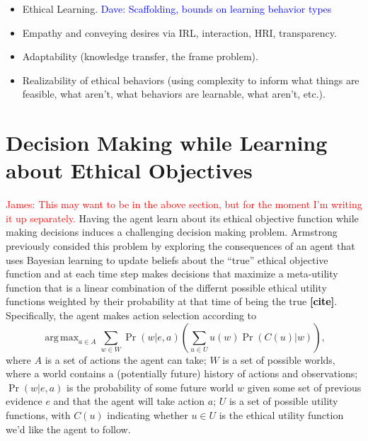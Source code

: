 \documentclass[11pt]{article}
\newcommand\davenote[1]{\textcolor{blue}{Dave: #1}}
\newcommand\jmnote[1]{\textcolor{red}{James: #1}}
\newcommand\ncite{\textcolor{black}{{\bf [cite]}}}
\DeclareMathOperator*{\argmax}{arg\,max}
\begin{document}
\begin{itemize}
\item Ethical Learning. \davenote{Scaffolding, bounds on learning behavior types}
\item Empathy and conveying desires via IRL, interaction, HRI, transparency.
\item Adaptability (knowledge transfer, the frame problem).
\item Realizability of ethical behaviors (using complexity to inform what things are feasible, what aren't, what behaviors are learnable, what aren't, etc.).
\end{itemize}

\section{Decision Making while Learning about Ethical Objectives}
\jmnote{This may want to be in the above section, but for the moment I'm writing it up separately.}
Having the agent learn about its ethical objective function while making decisions induces a challenging decision making problem. Armstrong previously consided this problem by exploring the consequences of an agent that uses Bayesian learning to update beliefs about the ``true'' ethical objective function and at each time step makes decisions that maximize a meta-utility function that is a linear combination of the differnt possible ethical utility functions weighted by their probability at that time of being the true \ncite. Specifically, the agent makes action selection according to
\begin{equation}
\label{eq:armstrong}
\argmax_{a \in A} \sum_{w \in W} \Pr(w | e, a) \left( \sum_{u \in U} u(w) \Pr(C(u)|w) \right),
\end{equation}
where $A$ is a set of actions the agent can take; $W$ is a set of possible worlds, where a world contains a (potentially future) history of actions and observations; $\Pr(w | e, a)$ is the probability of some future world $w$ given some set of previous evidence $e$ and that the agent will take action $a$; $U$ is a set of possible utility functions, with $C(u)$ indicating whether $u \in U$ is the ethical utility function we'd like the agent to follow.
\end{document}
